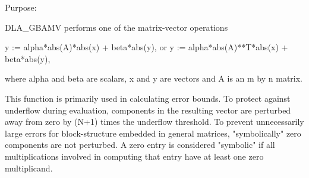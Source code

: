  \begin{DoxyParagraph}{Purpose\+: }
\begin{DoxyVerb} DLA_GBAMV  performs one of the matrix-vector operations

         y := alpha*abs(A)*abs(x) + beta*abs(y),
    or   y := alpha*abs(A)**T*abs(x) + beta*abs(y),

 where alpha and beta are scalars, x and y are vectors and A is an
 m by n matrix.

 This function is primarily used in calculating error bounds.
 To protect against underflow during evaluation, components in
 the resulting vector are perturbed away from zero by (N+1)
 times the underflow threshold.  To prevent unnecessarily large
 errors for block-structure embedded in general matrices,
 "symbolically" zero components are not perturbed.  A zero
 entry is considered "symbolic" if all multiplications involved
 in computing that entry have at least one zero multiplicand.\end{DoxyVerb}
 
\end{DoxyParagraph}


